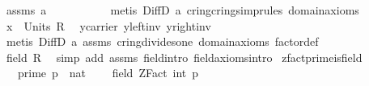 \begin{isabellebody}
\ assms{\isacharparenleft}{\kern0pt}{}{\isacharparenright}{\kern0pt}\ a\ \isanewline
\ \ \ \ \ \ \ \ \isamarkupfalse%
\ {\isacharparenleft}{\kern0pt}metis\ DiffD{}\ a\ cring{\isachardot}{\kern0pt}cring{\isacharunderscore}{\kern0pt}simprules{\isacharparenleft}{\kern0pt}{}{}{\isacharparenright}{\kern0pt}\ domain{\isachardot}{\kern0pt}axioms{\isacharparenleft}{\kern0pt}{}{\isacharparenright}{\kern0pt}{\isacharparenright}{\kern0pt}\isanewline
\ \ \ \ \ \ \isamarkupfalse%
\ {\isachardoublequoteopen}x\ {\isasymin}\ Units\ R{\isachardoublequoteclose}\ \isamarkupfalse%
\ y{\isacharunderscore}{\kern0pt}carrier\ y{\isacharunderscore}{\kern0pt}left{\isacharunderscore}{\kern0pt}inv\ y{\isacharunderscore}{\kern0pt}right{\isacharunderscore}{\kern0pt}inv\isanewline
\ \ \ \ \ \ \ \ \isamarkupfalse%
\ {\isacharparenleft}{\kern0pt}metis\ DiffD{}\ a\ assms{\isacharparenleft}{\kern0pt}{}{\isacharparenright}{\kern0pt}\ cring{\isachardot}{\kern0pt}divides{\isacharunderscore}{\kern0pt}one\ domain{\isachardot}{\kern0pt}axioms{\isacharparenleft}{\kern0pt}{}{\isacharparenright}{\kern0pt}\ factor{\isacharunderscore}{\kern0pt}def{\isacharparenright}{\kern0pt}\isanewline
\ \ \ \ \isamarkupfalse%
\isanewline
\ \ \isamarkupfalse%
\isanewline
\ \ \isamarkupfalse%
\ \isamarkupfalse%
\ {\isachardoublequoteopen}field\ R{\isachardoublequoteclose}\ \isamarkupfalse%
\ {\isacharparenleft}{\kern0pt}simp\ add{\isacharcolon}{\kern0pt}\ assms{\isacharparenleft}{\kern0pt}{}{\isacharparenright}{\kern0pt}\ field{\isachardot}{\kern0pt}intro\ field{\isacharunderscore}{\kern0pt}axioms{\isachardot}{\kern0pt}intro{\isacharparenright}{\kern0pt}\isanewline
{}\isamarkupfalse%
%
\endisatagproof
{\isafoldproof}%
%
\isadelimproof
\isanewline
%
\endisadelimproof
\isanewline
{}\isamarkupfalse%
\ zfact{\isacharunderscore}{\kern0pt}prime{\isacharunderscore}{\kern0pt}is{\isacharunderscore}{\kern0pt}field{\isacharcolon}{\kern0pt}\isanewline
\ \ \ {\isachardoublequoteopen}prime\ {\isacharparenleft}{\kern0pt}p\ {\isacharcolon}{\kern0pt}{\isacharcolon}{\kern0pt}\ nat{\isacharparenright}{\kern0pt}{\isachardoublequoteclose}\ \isanewline
\ \ \ {\isachardoublequoteopen}field\ {\isacharparenleft}{\kern0pt}ZFact\ {\isacharparenleft}{\kern0pt}int\ p{\isacharparenright}{\kern0pt}{\isacharparenright}{\kern0pt}{\isachardoublequoteclose}\isanewline

\end{isabellebody}
